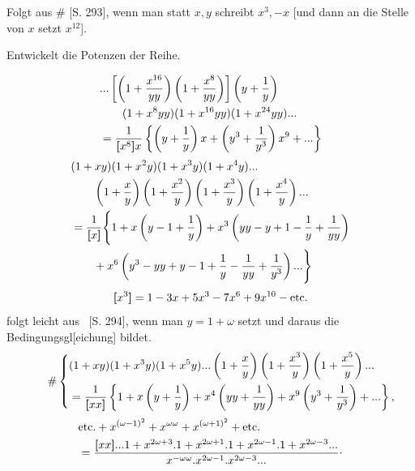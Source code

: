 {\small
\par{}
\par\indent [**)] Folgt aus \# [S. 293], wenn man statt $x,y$ schreibt $x^3,-x$ [und dann an die Stelle von $x$ setzt $x^{12}$].
\par\indent [***)] Entwickelt die Potenzen der Reihe.
\par}
\clearpage
{}
\[\begin{aligned}
&{.}{.}{.}\left[\left(1+\frac{x^{16}}{yy}\right)\left(1+\frac{x^8}{yy}\right)\right]\left(y+\frac1y\right)\\
&\qquad(1+x^8yy)(1+x^{16}yy)(1+x^{24}yy){.}{.}{.}\\
&=\frac1{\boldsymbol{[}x^8\boldsymbol{]}x}\left\{\left(y+\frac1y\right)x+\left(y^3+\frac1{y^3}\right)x^9+{.}{.}{.}\right\}
\end{aligned}\]
\[\begin{aligned}
&(1+xy)(1+x^2y)(1+x^3y)(1+x^4y){.}{.}{.}\\
&\qquad\left(1+\frac xy\right)\left(1+\frac{x^2}y\right)\left(1+\frac{x^3}y\right)\left(1+\frac{x^4}y\right){.}{.}{.}\\
&=\frac1{\boldsymbol{[}x\boldsymbol{]}}\Biggl\{1+x\left(y-1+\frac1y\right)+x^3\left(yy-y+1-\frac1y+\frac1{yy}\right)\\
&\qquad+x^6\left(y^3-yy+y-1+\frac1y-\frac1{yy}+\frac1{y^3}\right){.}{.}{.}\Biggr\}
\end{aligned}\]
\ClosingRule
\[\boldsymbol{[}x^3\boldsymbol{]}=1-3x+5x^3-7x^6+9x^{10}-\text{etc.}\]
\noindent folgt leicht aus \TransCrescent\ [S. 294], wenn man $y=1+\omega$ setzt und daraus die Bedingungsgl[eichung] bildet.
\ClosingRule
\begin{equation*}\tag*{\#}
\left\{\begin{aligned}
&(1+xy)(1+x^3y)(1+x^5y){.}{.}{.}\left(1+\frac xy\right)\left(1+\frac{x^3}y\right)\left(1+\frac{x^5}y\right){.}{.}{.}\\
&=\frac1{\boldsymbol{[}xx\boldsymbol{]}}\left\{1+x\left(y+\frac1y\right)+x^4\left(yy+\frac1{yy}\right)+x^9\left(y^3+\frac1{y^3}\right)+{.}{.}{.}\right\},
\end{aligned}\right.
\end{equation*}
\[\begin{aligned}
&\text{etc.}+x^{(\omega-1)^2}+x^{\omega\omega}+x^{(\omega+1)^2}+\text{etc.}\\
&=\frac{\TransBracket{xx}{.}{.}{.}1+x^{2\omega+3}.1+x^{2\omega+1}.1+x^{2\omega-1}.1+x^{2\omega-3}{.}{.}{.}}{x^{-\omega\omega}.x^{2\omega-1}.x^{2\omega-3}{.}{.}{.}}\mathpunct{\raisebox{.5ex}{.}}
\end{aligned}\]
\clearpage
\endgroup
